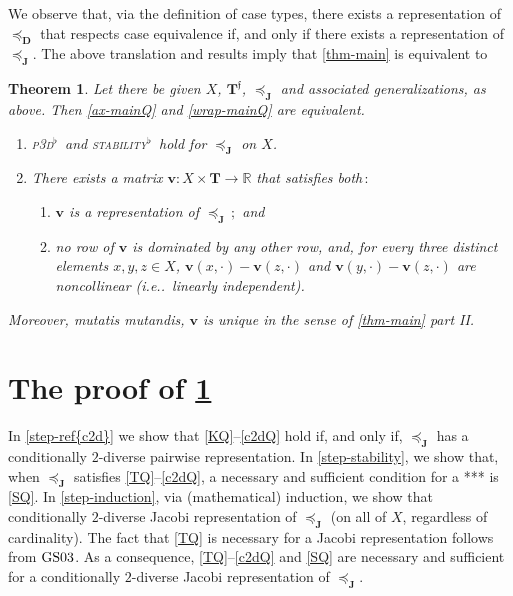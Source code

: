 \documentclass[ecta,nameyear,draft]{econsocart}
\makeatletter
\newcommand{\R}{\mathbb R}
\newcommand{\novel}{\mathfrak f}
\newcommand{\preceqb}{\mathbin{\preceq}}
\newcommand{\mbbd}{{\mathbf D}}
\newcommand{\mbbt}{{\mathbf {T}}}
\newcommand{\mbbtp}{{\mathbf{T}^\novel}}
\newcommand{\mbbj}{\mathbf J}
\newcommand{\stabilityq}{\textsc{{stability}$^\flat$}}
\newcommand{\parthreedivq}{\textsc{p3d}$^\flat$}
\newcommand\ie{i\@.e\@ifnextchar.{}{.\@}}
\newcommand{\gsii}{$\textup{GS03}$}
\theoremstyle{plain}
\newtheorem{theorem}{Theorem}%
\theoremstyle{remark}
\makeatother
\begin{document}
\begin{appendix}
  We observe that, via the definition of case types, there exists a
  representation of $\preceq_{\mbbd}$ that respects case equivalence if, and
  only if there exists a representation of $\preceq_{\mbbj}$. The above
  translation and results imply that \cref{thm-main} is equivalent to
  \begin{theorem}\label{thm-mainQ} Let there be given $X$, $\mbbtp$,
    $\preceqb_{\mbbj}$ and associated generalizations, as above. Then
    \ref{ax-mainQ} and \ref{wrap-mainQ} are equivalent.
    \begin{enumerate}[label=\textup{(\ref{thm-mainQ}.\roman*)}]
      \item\label{ax-mainQ} \parthreedivq\ and \stabilityq\ hold for 
        $\preceqb _ {\mbbj}$ on $X$.
      \item\label{wrap-mainQ} There exists a matrix $\mathbf{v} : X \times
        \mbbt \rightarrow \R$ that satisfies both$\,:$
        \begin{enumerate}[label=\textup{(\ref{thm-mainQ}.\alph*)}]
          \item\label{rep-mainQ} $\mathbf{v}$ is a representation of $\preceq _
            {\mbbj}\,;$ and
          \item\label{rows-mainQ} no row of $\mathbf{v}$ is dominated by any
            other row, and, for every three distinct elements $x,y, z \in X$,
            $\mathbf{v}(x,\cdot)-\mathbf{v}(z,\cdot) $ and
            $\mathbf{v}(y,\cdot)-\mathbf{v}(z,\cdot)$ are noncollinear (\ie\
            linearly independent).
        \end{enumerate}
    \end{enumerate}
    Moreover, \emph{mutatis mutandis}, $\mathbf{v}$ is unique in the sense of
    \cref{thm-main} part II.
  \end{theorem}

  \section{The proof of \cref{thm-mainQ}}\label{sec-proof-mainQ} 
    In \cref{step-ref{c2d}} we show that
    \ref{KQ}–\ref{c2dQ} hold if, and only if, $\preceq_{\mbbj}$ has a
    conditionally $2$-diverse pairwise representation.  In
    \cref{step-stability}, we show that, when $\preceq_{\mbbj}$ satisfies
    \ref{TQ}–\ref{c2dQ}, a necessary and sufficient condition for a *** is
    \ref{SQ}. In \cref{step-induction}, via (mathematical) induction, we
    show that conditionally $2$-diverse Jacobi representation of
    $\preceq_{\mbbj}$ (on all of $X$, regardless of cardinality). The fact that
    \ref{TQ} is necessary for a Jacobi representation follows from \gsii.  As a
    consequence, \ref{TQ}–\ref{c2dQ} and \ref{SQ} are necessary and sufficient
    for a conditionally $2$-diverse Jacobi representation of $\preceq_{\mbbj}$.
  

\end{appendix}
\end{document}
